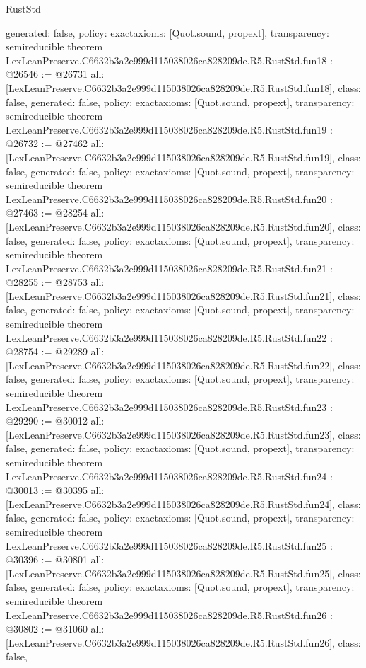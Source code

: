 \begin{lexlean}{RustStd}
\begin{coremodule}
{  generated: false,
  policy: exact{axioms: [Quot.sound, propext]},
  transparency: semireducible
}
theorem LexLeanPreserve.C6632b3a2e999d115038026ca828209de.R5.RustStd.fun18 : @26546 := @26731 {
  all: [LexLeanPreserve.C6632b3a2e999d115038026ca828209de.R5.RustStd.fun18],
  class: false,
  generated: false,
  policy: exact{axioms: [Quot.sound, propext]},
  transparency: semireducible
}
theorem LexLeanPreserve.C6632b3a2e999d115038026ca828209de.R5.RustStd.fun19 : @26732 := @27462 {
  all: [LexLeanPreserve.C6632b3a2e999d115038026ca828209de.R5.RustStd.fun19],
  class: false,
  generated: false,
  policy: exact{axioms: [Quot.sound, propext]},
  transparency: semireducible
}
theorem LexLeanPreserve.C6632b3a2e999d115038026ca828209de.R5.RustStd.fun20 : @27463 := @28254 {
  all: [LexLeanPreserve.C6632b3a2e999d115038026ca828209de.R5.RustStd.fun20],
  class: false,
  generated: false,
  policy: exact{axioms: [Quot.sound, propext]},
  transparency: semireducible
}
theorem LexLeanPreserve.C6632b3a2e999d115038026ca828209de.R5.RustStd.fun21 : @28255 := @28753 {
  all: [LexLeanPreserve.C6632b3a2e999d115038026ca828209de.R5.RustStd.fun21],
  class: false,
  generated: false,
  policy: exact{axioms: [Quot.sound, propext]},
  transparency: semireducible
}
theorem LexLeanPreserve.C6632b3a2e999d115038026ca828209de.R5.RustStd.fun22 : @28754 := @29289 {
  all: [LexLeanPreserve.C6632b3a2e999d115038026ca828209de.R5.RustStd.fun22],
  class: false,
  generated: false,
  policy: exact{axioms: [Quot.sound, propext]},
  transparency: semireducible
}
theorem LexLeanPreserve.C6632b3a2e999d115038026ca828209de.R5.RustStd.fun23 : @29290 := @30012 {
  all: [LexLeanPreserve.C6632b3a2e999d115038026ca828209de.R5.RustStd.fun23],
  class: false,
  generated: false,
  policy: exact{axioms: [Quot.sound, propext]},
  transparency: semireducible
}
theorem LexLeanPreserve.C6632b3a2e999d115038026ca828209de.R5.RustStd.fun24 : @30013 := @30395 {
  all: [LexLeanPreserve.C6632b3a2e999d115038026ca828209de.R5.RustStd.fun24],
  class: false,
  generated: false,
  policy: exact{axioms: [Quot.sound, propext]},
  transparency: semireducible
}
theorem LexLeanPreserve.C6632b3a2e999d115038026ca828209de.R5.RustStd.fun25 : @30396 := @30801 {
  all: [LexLeanPreserve.C6632b3a2e999d115038026ca828209de.R5.RustStd.fun25],
  class: false,
  generated: false,
  policy: exact{axioms: [Quot.sound, propext]},
  transparency: semireducible
}
theorem LexLeanPreserve.C6632b3a2e999d115038026ca828209de.R5.RustStd.fun26 : @30802 := @31060 {
  all: [LexLeanPreserve.C6632b3a2e999d115038026ca828209de.R5.RustStd.fun26],
  class: false,
}
\end{coremodule}
\end{lexlean}
